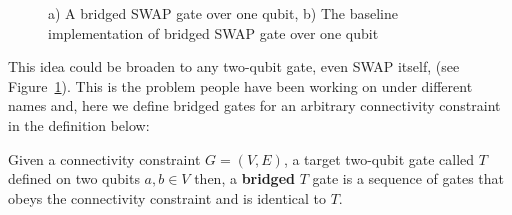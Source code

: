 \begin{figure}[h!]
  \label{fig:bridged-swap-1}
  \centering
  \caption{a) A bridged SWAP gate over one qubit, b) The baseline implementation of bridged SWAP gate over one qubit}
\end{figure}

This idea could be broaden to any two-qubit gate, even SWAP itself, (see Figure~\ref{fig:bridged-swap-1}). This is the problem people have been working on under different names \cite{shende2006} and, here we define bridged gates for an arbitrary connectivity constraint in the definition below:

\begin{definition}
  Given a connectivity constraint $G = (V, E)$, a target two-qubit gate called $T$ defined on two qubits $a, b \in V$ then, a \textbf{bridged} $T$ gate is a sequence of gates that obeys the connectivity constraint and is identical to $T$.
\end{definition}

